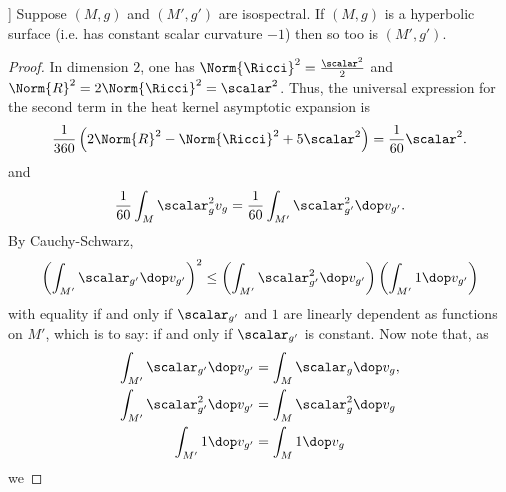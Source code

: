 \begin{proposition}[prop. E.IV.15 in]\cite{Berger.Gauduchon.Mazet-[SpectreVarieteRiemannienne]1971a}]
  Suppose  $(M,g)$ and $(M',g')$ are isospectral. If $(M,g)$ is  a hyperbolic surface (i.e. has constant scalar curvature $-1$)  then so too is $(M',g')$.
\end{proposition}
\begin{proof}
  In dimension $2$, one has $\Norm{\Ricci}^2 = \frac{\scalar^2}{2}$ and $\Norm{R}^2 = 2 \Norm{\Ricci}^2 = \scalar^2$. Thus, the universal expression for the second term in the heat kernel asymptotic expansion is
  \begin{align}
    \frac{1}{360}\left(2\Norm{R}^2 - \Norm{\Ricci}^2 + 5 \scalar^2\right) =\frac{1}{60} \scalar^2.
  \end{align}
  and
  \begin{align}
    \frac{1}{60} \int_M \scalar_{g}^2 v_g = \frac{1}{60} \int_{M'} \scalar_{g'}^2 \dop v_{g'}.
  \end{align}
  By Cauchy-Schwarz,
  \begin{align}\label{eq:cauchySchwarz}
    \left( \int_{M'} \scalar_{g'} \dop v_{g'} \right)^2 \leq \left( \int_{M'} \scalar_{g'}^2 \dop v_{g'} \right)\left( \int_{M'} 1 \dop v_{g'} \right)
  \end{align}
  with equality if and only if $\scalar_{g'}$ and $1$ are linearly dependent as functions on $M'$, which is to say: if and only if $\scalar_{g'}$ is constant. Now note that, as
  \begin{align}
    \int_{M'}\scalar_{g'}\dop v_{g'}   & =\int_{M}\scalar_{g}\dop v_{g},  \\
    \int_{M'}\scalar_{g'}^2\dop v_{g'} & =\int_{M}\scalar_{g}^2\dop v_{g} \\
    \int_{M'}1\dop v_{g'}              & =\int_{M}1\dop v_{g}
  \end{align}
we 
\end{proof}
\newpage




